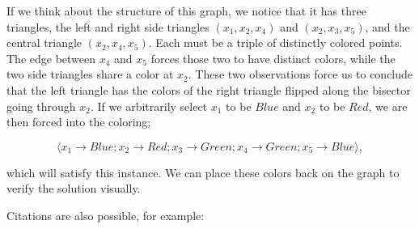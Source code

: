 If we think about the structure of this graph, we notice that it has three triangles, the left and right side triangles $(x_1, x_2, x_4)$  and $(x_2, x_3, x_5)$, and the central triangle $(x_2, x_4, x_5)$. Each must be a triple of distinctly colored points. The edge between $x_4$ and $x_5$ forces those two to have distinct colors, while the two side triangles share a color at $x_2$. These two observations force us to conclude that the left triangle has the colors of the right triangle flipped along the bisector going through $x_2$. If we arbitrarily select $x_1$ to be $\mathit{Blue}$ and $x_2$ to be $\mathit{Red}$, we are then forced into the coloring;

\begin{equation}
 \langle x_1 \rightarrow \mathit{Blue}; x_2 \rightarrow \mathit{Red}; x_3 \rightarrow \mathit{Green}; x_4 \rightarrow \mathit{Green}; x_5 \rightarrow \mathit{Blue}\rangle,
\end{equation}

which will satisfy this instance. We can place these colors back on the graph to verify the solution visually.

Citations are also possible, for example: \citep{christopher_goes_2023_8279842}
